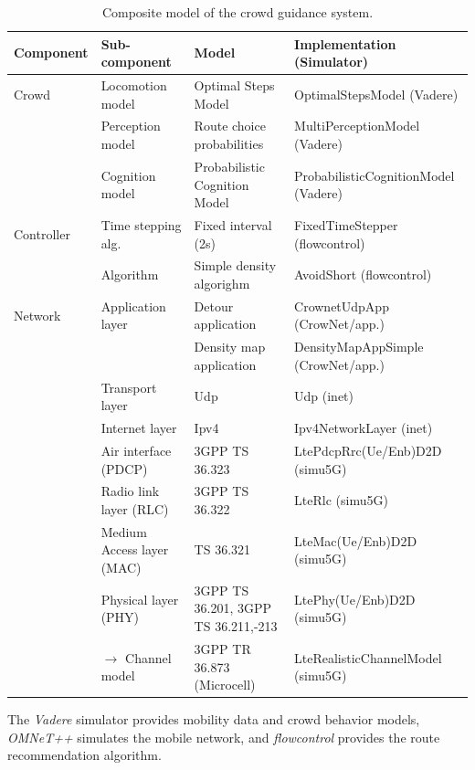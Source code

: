 \begin{table}[hbt!]
\begin{footnotesize}
\begin{tabular}{p{1.4cm}p{3.6cm}p{3.5cm}p{4cm}}
\hline
Component & Sub-component & Model  & Implementation (Simulator) \\ \hline
Crowd  & Locomotion model & Optimal Steps Model & OptimalStepsModel (Vadere) \\
& Perception model &  Route choice probabilities & MultiPerceptionModel (Vadere)  \\
& Cognition model & Probabilistic Cognition Model & ProbabilisticCognitionModel (Vadere)  \\

Controller &
Time stepping alg. & Fixed interval (2s) & FixedTimeStepper (flowcontrol)  \\
&  Algorithm & Simple density algorighm & AvoidShort (flowcontrol) \\

Network & Application layer & Detour application &  CrownetUdpApp  (CrowNet/app.) \\
&& Density map application &  DensityMapAppSimple  (CrowNet/app.) \\
&Transport layer & Udp  & Udp (inet) \\
&Internet layer & Ipv4  & Ipv4NetworkLayer (inet) \\
&Air interface (PDCP) &  3GPP TS 36.323 & LtePdcpRrc(Ue/Enb)D2D (simu5G) \\
&Radio link layer (RLC) & 3GPP TS 36.322 &  LteRlc (simu5G) \\
&Medium Access layer (MAC) & TS 36.321  &  LteMac(Ue/Enb)D2D (simu5G) \\
&Physical layer (PHY) &  3GPP TS 36.201, 3GPP TS 36.211,-213 &  LtePhy(Ue/Enb)D2D (simu5G) \\
&$\rightarrow$ Channel model & 3GPP TR 36.873 (Microcell) & LteRealisticChannelModel (simu5G) \\
\hline
\end{tabular} 
\end{footnotesize}
\caption[Composite model for the simulation of the real-life use case]{Composite model of the crowd guidance system. 
}
\label{tab:composedrealistic}
\end{table}


The \textit{Vadere} simulator provides mobility data and crowd behavior models, \textit{OMNeT++} simulates the mobile network, and \textit{flowcontrol} provides the route recommendation algorithm.

